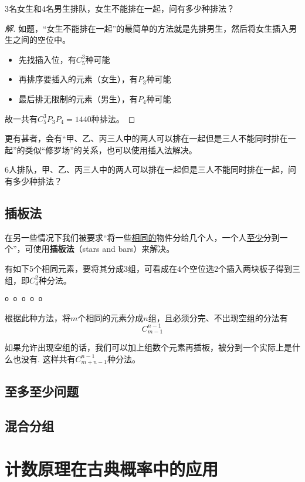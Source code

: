 \begin{example}
	$3$名女生和$4$名男生排队，女生不能排在一起，问有多少种排法？
\end{example}

\begin{proof}[解]
	如题，“女生不能排在一起”的最简单的方法就是先排男生，然后将女生插入男生之间的空位中。

	\begin{itemize}
		\item 先找插入位，有$C_5^3$种可能
		\item 再排序要插入的元素（女生），有$P_3$种可能
		\item 最后排无限制的元素（男生），有$P_4$种可能
	\end{itemize}

	故一共有$C_5^3P_3P_4=1440$种排法。
\end{proof}

更有甚者，会有“甲、乙、丙三人中的两人可以排在一起但是三人不能同时排在一起”的类似“修罗场”的关系，也可以使用插入法解决。

\begin{example}
	$6$人排队，甲、乙、丙三人中的两人可以排在一起但是三人不能同时排在一起，问有多少种排法？
\end{example}

\subsection{插板法}
在另一些情况下我们被要求“将一些\uline{相同的}物件分给几个人，一个人\uline{至少}分到一个”，可使用\textbf{插板法}（stars and bars）来解决。

有如下5个相同元素，要将其分成3组，可看成在4个空位选2个插入两块板子得到三组，即$C_4^2$种分法。

\begin{center}
	\verb*|o o o o o|
\end{center}

根据此种方法，将$m$个相同的元素分成$n$组，且必须分完、不出现空组的分法有\[C_{m-1}^{n-1}\]

如果允许出现空组的话，我们可以加上组数个元素再插板，被分到一个实际上是什么也没有. 这样共有$C_{m+n-1}^{n-1}$种分法。

\subsection{至多至少问题}

\subsection{混合分组}

\section[概率]{计数原理在古典概率中的应用}
